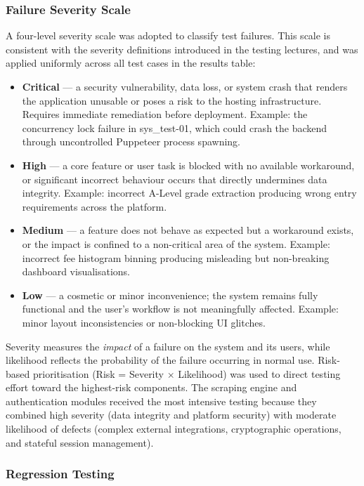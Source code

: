 \subsubsection*{Failure Severity Scale}

A four-level severity scale was adopted to classify test failures. This scale is consistent with the severity definitions introduced in the testing lectures, and was applied uniformly across all test cases in the results table:

\begin{itemize}
    \item \textbf{Critical} --- a security vulnerability, data loss, or system crash that renders the application unusable or poses a risk to the hosting infrastructure. Requires immediate remediation before deployment. Example: the concurrency lock failure in sys\_test-01, which could crash the backend through uncontrolled Puppeteer process spawning.
    \item \textbf{High} --- a core feature or user task is blocked with no available workaround, or significant incorrect behaviour occurs that directly undermines data integrity. Example: incorrect A-Level grade extraction producing wrong entry requirements across the platform.
    \item \textbf{Medium} --- a feature does not behave as expected but a workaround exists, or the impact is confined to a non-critical area of the system. Example: incorrect fee histogram binning producing misleading but non-breaking dashboard visualisations.
    \item \textbf{Low} --- a cosmetic or minor inconvenience; the system remains fully functional and the user's workflow is not meaningfully affected. Example: minor layout inconsistencies or non-blocking UI glitches.
\end{itemize}

\noindent Severity measures the \textit{impact} of a failure on the system and its users, while likelihood reflects the probability of the failure occurring in normal use. Risk-based prioritisation (Risk = Severity $\times$ Likelihood) was used to direct testing effort toward the highest-risk components. The scraping engine and authentication modules received the most intensive testing because they combined high severity (data integrity and platform security) with moderate likelihood of defects (complex external integrations, cryptographic operations, and stateful session management).

\subsubsection*{Regression Testing}

